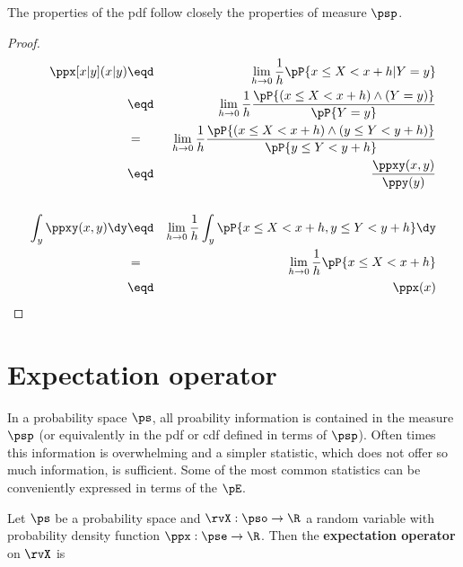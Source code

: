 The properties of the pdf follow closely the properties of measure $\psp$.
\begin{theorem}
\end{theorem}
\begin{proof}
\begin{eqnarray*}
  \ppx[x|y](x|y)
    &\eqd& \lim_{h\to0} \frac{1}{h} \pP{x\le X < x+h | Y=y}
  \\&\eqd& \lim_{h\to0} \frac{1}{h} \frac{\pP{(x\le X < x+h) \land (Y=y)}}{\pP{Y=y}}
  \\&=&    \lim_{h\to0} \frac{1}{h} \frac{\pP{(x\le X < x+h) \land (y\le Y<y+h)}}{\pP{y\le Y<y+h}}
  \\&\eqd& \frac{\ppxy(x,y)}{\ppy(y)}
\\
\\
  \int_y\ppxy(x,y)\dy
    &\eqd& \lim_{h\to0} \frac{1}{h}
           \int_y \pP{x\le X<x+h, y\le Y<y+h} \dy
  \\&=&    \lim_{h\to0} \frac{1}{h} \pP{x\le X<x+h}
  \\&\eqd& \ppx(x)
\end{eqnarray*}
\end{proof}
\section{Expectation operator}
In a probability space $\ps$, all proability information
is contained in the measure $\psp$ (or equivalently in the pdf or cdf
defined in terms of $\psp$).
Often times this information is overwhelming and a simpler statistic,
which does not offer so much information, is sufficient.
Some of the most common statistics can be conveniently expressed in terms
of the  $\pE$.
\begin{definition}
Let $\ps$ be a probability space and
$\rvX:\pso\to\R$ a random variable with
probability density function $\ppx:\pse\to\R$.
Then the {\bf expectation operator} on $\rvX$ is
\end{definition}

